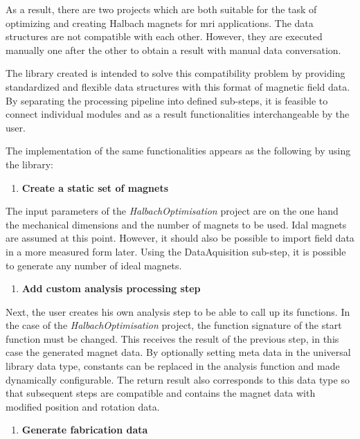 As a result, there are two projects which are both suitable for the task
of optimizing and creating Halbach magnets for \gls{mri} applications.
The data structures are not compatible with each other. However, they
are executed manually one after the other to obtain a result with manual
data conversation.

The library created is intended to solve this compatibility problem by
providing standardized and flexible data structures with this format of
magnetic field data. By separating the processing pipeline into defined
sub-steps, it is feasible to connect individual modules and as a result
functionalities interchangeable by the user.

The implementation of the same functionalities appears as the following
by using the library:

\begin{enumerate}
\def\labelenumi{\arabic{enumi}.}
\tightlist
\item
  \textbf{Create a static set of magnets}
\end{enumerate}

The input parameters of the \emph{HalbachOptimisation} 
project are on the one hand the mechanical dimensions and the number of
magnets to be used. Idal magnets are assumed at this point. However, it
should also be possible to import field data in a more measured form
later. Using the DataAquisition sub-step, it is possible to generate any
number of ideal magnets.

\begin{enumerate}
\def\labelenumi{\arabic{enumi}.}
\setcounter{enumi}{1}
\tightlist
\item
  \textbf{Add custom analysis processing step}
\end{enumerate}

Next, the user creates his own analysis step to be able to call up its
functions. In the case of the \emph{HalbachOptimisation} 
project, the function signature of the start function must be changed.
This receives the result of the previous step, in this case the
generated magnet data. By optionally setting meta data in the universal
library data type, constants can be replaced in the analysis function
and made dynamically configurable. The return result also corresponds to
this data type so that subsequent steps are compatible and contains the
magnet data with modified position and rotation data.

\begin{enumerate}
\def\labelenumi{\arabic{enumi}.}
\setcounter{enumi}{2}
\tightlist
\item
  \textbf{Generate fabrication data}
\end{enumerate}

